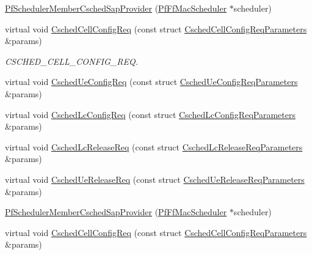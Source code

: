 \begin{DoxyCompactItemize}
\item 
\hyperlink{classns3_1_1PfSchedulerMemberCschedSapProvider_a01937ed0f98bda9e233859cfbfd8158a}{Pf\+Scheduler\+Member\+Csched\+Sap\+Provider} (\hyperlink{classns3_1_1PfFfMacScheduler}{Pf\+Ff\+Mac\+Scheduler} $\ast$scheduler)
\item 
virtual void \hyperlink{classns3_1_1PfSchedulerMemberCschedSapProvider_ad84d76181fb096b52c1998c0efee8104}{Csched\+Cell\+Config\+Req} (const struct \hyperlink{structns3_1_1FfMacCschedSapProvider_1_1CschedCellConfigReqParameters}{Csched\+Cell\+Config\+Req\+Parameters} \&params)
\begin{DoxyCompactList}\small\item\em C\+S\+C\+H\+E\+D\+\_\+\+C\+E\+L\+L\+\_\+\+C\+O\+N\+F\+I\+G\+\_\+\+R\+EQ. \end{DoxyCompactList}\item 
virtual void \hyperlink{classns3_1_1PfSchedulerMemberCschedSapProvider_a7d1caad2843abc1a256523d52b4b042a}{Csched\+Ue\+Config\+Req} (const struct \hyperlink{structns3_1_1FfMacCschedSapProvider_1_1CschedUeConfigReqParameters}{Csched\+Ue\+Config\+Req\+Parameters} \&params)
\item 
virtual void \hyperlink{classns3_1_1PfSchedulerMemberCschedSapProvider_add4624c3390b6113c802a81a532dadec}{Csched\+Lc\+Config\+Req} (const struct \hyperlink{structns3_1_1FfMacCschedSapProvider_1_1CschedLcConfigReqParameters}{Csched\+Lc\+Config\+Req\+Parameters} \&params)
\item 
virtual void \hyperlink{classns3_1_1PfSchedulerMemberCschedSapProvider_a1d833eaa90681542bb8073a93240d0d2}{Csched\+Lc\+Release\+Req} (const struct \hyperlink{structns3_1_1FfMacCschedSapProvider_1_1CschedLcReleaseReqParameters}{Csched\+Lc\+Release\+Req\+Parameters} \&params)
\item 
virtual void \hyperlink{classns3_1_1PfSchedulerMemberCschedSapProvider_a9e1ed9a4867cbc862978cbffa7cb5810}{Csched\+Ue\+Release\+Req} (const struct \hyperlink{structns3_1_1FfMacCschedSapProvider_1_1CschedUeReleaseReqParameters}{Csched\+Ue\+Release\+Req\+Parameters} \&params)
\item 
\hyperlink{classns3_1_1PfSchedulerMemberCschedSapProvider_a01937ed0f98bda9e233859cfbfd8158a}{Pf\+Scheduler\+Member\+Csched\+Sap\+Provider} (\hyperlink{classns3_1_1PfFfMacScheduler}{Pf\+Ff\+Mac\+Scheduler} $\ast$scheduler)
\item 
virtual void \hyperlink{classns3_1_1PfSchedulerMemberCschedSapProvider_a3a8d8067a94ccc1e574629a0fbb661f6}{Csched\+Cell\+Config\+Req} (const struct \hyperlink{structns3_1_1FfMacCschedSapProvider_1_1CschedCellConfigReqParameters}{Csched\+Cell\+Config\+Req\+Parameters} \&params)

\end{DoxyCompactItemize}
